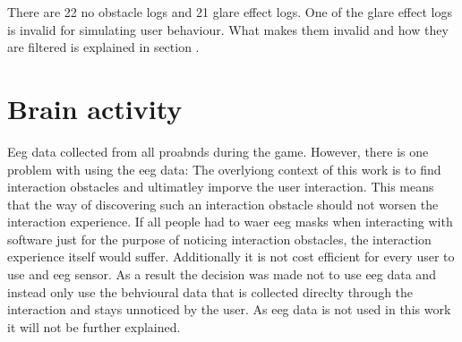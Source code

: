 There are 22 no obstacle logs and 21 glare effect logs. One of the glare effect logs is invalid for simulating user behaviour. What makes them invalid and how they are filtered is explained in section .

\section{Brain activity}

Eeg data collected from all proabnds during the game. However, there is one problem with using the eeg data: The overlyiong context of this work is to find interaction obstacles and ultimatley imporve the user interaction. This means that the way of discovering such an interaction obstacle should not worsen the interaction experience. If all people had to waer eeg masks when interacting with software just for the purpose of noticing interaction obstacles, the interaction experience itself would suffer. Additionally it is not cost efficient for every user to use and eeg sensor. As a result the decision was made not to use eeg data and instead only use the behvioural data that is collected direclty through the interaction and stays unnoticed by the user. As eeg data is not used in this work it will not be further explained. 




